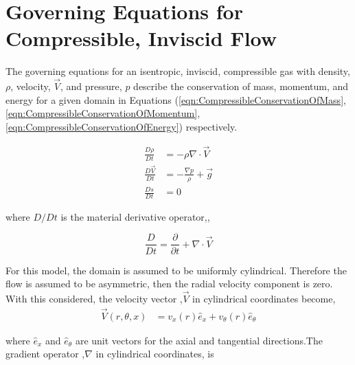 

\section{Governing Equations for Compressible, Inviscid Flow}

The governing equations for an isentropic, inviscid, compressible gas with 
density, $\rho$, velocity, $\vec{V}$, and pressure, $p$ describe the 
conservation of mass, momentum, and energy for a 
given domain in Equations (\ref{eqn:CompressibleConservationOfMass},
\ref{eqn:CompressibleConservationOfMomentum},
\ref{eqn:CompressibleConservationOfEnergy}) respectively. 

\begin{align}
    \frac{D\rho}{Dt} &= - \rho \nabla \cdot \vec{V} 
    \label{eqn:CompressibleConservationOfMass} \\
    \frac{D\vec{V}}{Dt} &= - \frac{\nabla p}{\rho} + \vec{g} 
    \label{eqn:CompressibleConservationOfMomentum} \\
    \frac{Ds}{Dt} &= 0
    \label{eqn:CompressibleConservationOfEnergy} 
\end{align}

where $D/Dt$ is the material derivative operator,,

\begin{equation}
    \frac{D}{Dt} = \frac{\partial }{\partial t} + \nabla \cdot \vec{V}
    \label{eqn:MaterialDerivative}
\end{equation}


For this model, the domain is assumed to be uniformly cylindrical. Therefore the
flow is assumed to be asymmetric, then the radial velocity component is 
zero. With this considered, the velocity vector ,$\vec{V}$ in 
cylindrical coordinates become,
\begin{align}
    \vec{V}(r,\theta,x) &= v_x(r) \hat{e}_x + v_{\theta} (r) \hat{e}_{\theta} 
    \label{eqn:VelocityVector}
\end{align}
  
where $\hat{e}_x$ and $\hat{e}_{\theta}$ are unit vectors for the axial and 
tangential directions.The gradient operator ,$\nabla$ in cylindrical
coordinates, is 

